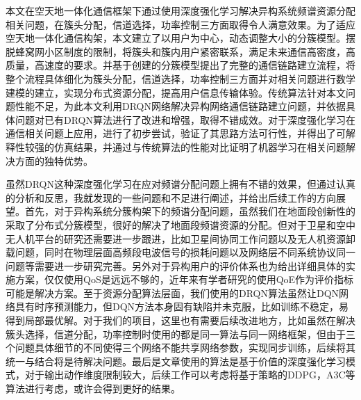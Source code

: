 \begin{conclusions}

本文在空天地一体化通信框架下通过使用深度强化学习解决异构系统频谱资源分配相关问题，在簇头分配，信道选择，功率控制三方面取得令人满意效果。为了适应空天地一体化通信构架，本文建立了以用户为中心，动态调整大小的分簇模型。摆脱蜂窝网小区制度的限制，将簇头和簇内用户紧密联系，满足未来通信高密度，高质量，高速度的要求。并基于创建的分簇模型提出了完整的通信链路建立流程，将整个流程具体细化为簇头分配，信道选择，功率控制三方面并对相关问题进行数学建模的建立，实现分布式资源分配，提高用户信息传输体验。传统算法针对本文问题性能不足，为此本文利用DRQN网络解决异构网络通信链路建立问题，并依据具体问题对已有DRQN算法进行了改进和增强，取得不错成效。对于深度强化学习在通信相关问题上应用，进行了初步尝试，验证了其思路方法可行性，并得出了可解释性较强的仿真结果，并通过与传统算法的性能对比证明了机器学习在相关问题解决方面的独特优势。

虽然DRQN这种深度强化学习在应对频谱分配问题上拥有不错的效果，但通过认真的分析和反思，我就发现的一些问题和不足进行阐述，并给出后续工作的方向展望。首先，对于异构系统分簇构架下的频谱分配问题，虽然我们在地面段创新性的采取了分布式分簇模型，很好的解决了地面段频谱资源的分配。但对于卫星和空中无人机平台的研究还需要进一步跟进，比如卫星间协同工作问题以及无人机资源卸载问题，同时在物理层面高频段电波信号的损耗问题以及网络层不同系统协议同一问题等需要进一步研究完善。另外对于异构用户的评价体系也为给出详细具体的实施方案，仅仅使用QoS是远远不够的，近年来有学者研究的使用QoE作为评价指标可能是解决方案。至于资源分配算法层面，我们使用的DRQN算法虽然让DQN网络具有时序预测能力，但DQN方法本身固有缺陷并未克服，比如训练不稳定，易得到局部最优解。对于我们的项目，这里也有需要后续改进地方，比如虽然在解决簇头选择，信道分配，功率控制时使用的都是同一算法与同一网络框架，但由于三个问题具体细节的不同使得三个网络不能共享网络参数，实现同步训练，后续将其统一与结合将是待解决问题。最后是文章使用的算法是基于价值的深度强化学习模式，对于输出动作维度限制较大，后续工作可以考虑将基于策略的DDPG，A3C等算法进行考虑，或许会得到更好的结果。

\end{conclusions}
